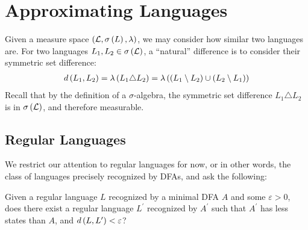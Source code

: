 \section{Approximating Languages}
Given a measure space
\(\left(\mathcal{L}, \sigma\left(L\right), \lambda\right)\),
we may consider how similar two languages are.
For two languages \(L_1, L_2 \in \sigma\left(\mathcal{L}\right)\),
a ``natural'' difference is to consider their
symmetric set difference:
\begin{align*}
  d\left(L_1, L_2\right)
    = \lambda\left(L_1 \triangle L_2\right)
    = \lambda\left(\left(L_1 \setminus L_2\right) \cup \left(L_2 \setminus L_1\right)\right)
\end{align*}
Recall that by the definition of a \(\sigma\)-algebra,
the symmetric set difference \(L_1 \triangle L_2\)
is in \(\sigma\left(\mathcal{L}\right)\), and therefore measurable.


\subsection{Regular Languages}
We restrict our attention to regular languages for now,
or in other words, the class of languages precisely recognized by
DFAs, and ask the following:

\begin{question}
  Given a regular language \(L\) recognized by a minimal DFA \(A\)
  and some \(\varepsilon > 0\),
  does there exist a regular language \(L^\prime\) recognized by \(A^\prime\)
  such that \(A^\prime\) has less states than \(A\),
  and \(d\left(L, L^\prime\right) < \varepsilon\)?
\end{question}



